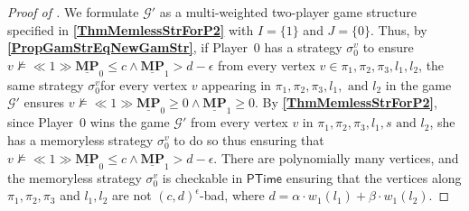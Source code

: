 \begin{proof}[Proof of \textbf{}]
\noindent We formulate $\mathcal{G'}$ as a multi-weighted two-player game structure specified in \textbf{\cref{ThmMemlessStrForP2}} with $I = \{1\}$ and $J = \{0\}$.
Thus, by \textbf{\cref{PropGamStrEqNewGamStr}}, if Player~0 has a strategy $\sigma_0^{v}$ to ensure $v \nvDash \ll 1 \gg \underline{\mathbf{MP}}_0 \leqslant c \land \underline{\mathbf{MP}}_1 > d-\epsilon$ from every vertex $v \in \pi_1, \pi_2, \pi_3, l_1, l_2$, the same strategy $\sigma_0^{v}$for every vertex $v$ appearing in $\pi_1, \pi_2, \pi_3, l_1, \text{ and } l_2$ in the game $\mathcal{G'}$ ensures $v \nvDash \ll 1 \gg \underline{\mathbf{MP}}_0 \geqslant 0 \land \underline{\mathbf{MP}}_1 \geqslant 0$. 
By \textbf{\cref{ThmMemlessStrForP2}}, since Player~0 wins the game $\mathcal{G}'$ from every vertex $v$ in $\pi_1, \pi_2, \pi_3, l_1, s \text{ and } l_2$, she has a memoryless strategy $\sigma_0^{v}$ to do so thus ensuring that $v \nvDash \ll 1 \gg \underline{\mathbf{MP}}_0 \leqslant c \land \underline{\mathbf{MP}}_1 > d - \epsilon$. 
There are polynomially many vertices, and the memoryless strategy $\sigma_0^{v}$ is checkable in $\mathsf{PTime}$ ensuring that the vertices along $\pi_1, \pi_2, \pi_3$ and $l_1, l_2$ are not $(c,d)^\epsilon$-bad, where $d = \alpha \cdot w_1(l_1) + \beta \cdot w_1(l_2)$.
\end{proof}
